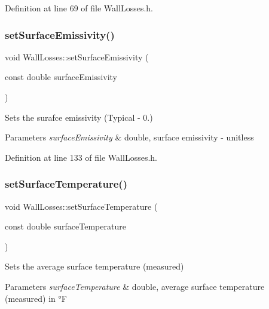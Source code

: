 Definition at line 69 of file Wall\+Losses.\+h.

\mbox{\label{class_wall_losses_ad0ebd1a0a1b32a2358da15b6c8e63d3a}} 
\subsubsection{\texorpdfstring{set\+Surface\+Emissivity()}{setSurfaceEmissivity()}}
{\footnotesize\ttfamily void Wall\+Losses\+::set\+Surface\+Emissivity (\begin{DoxyParamCaption}\item[{const double}]{surface\+Emissivity }\end{DoxyParamCaption})\hspace{0.3cm}{\ttfamily [inline]}}

Sets the surafce emissivity (Typical -\/ 0.) 
\begin{DoxyParams}{Parameters}
{\em surface\+Emissivity} & double, surface emissivity -\/ unitless \\
\hline
\end{DoxyParams}


Definition at line 133 of file Wall\+Losses.\+h.

\mbox{\label{class_wall_losses_a7aaa1bd0d7e0ec67db33668ccc6c48da}} 
\subsubsection{\texorpdfstring{set\+Surface\+Temperature()}{setSurfaceTemperature()}}
{\footnotesize\ttfamily void Wall\+Losses\+::set\+Surface\+Temperature (\begin{DoxyParamCaption}\item[{const double}]{surface\+Temperature }\end{DoxyParamCaption})\hspace{0.3cm}{\ttfamily [inline]}}

Sets the average surface temperature (measured) 
\begin{DoxyParams}{Parameters}
{\em surface\+Temperature} & double, average surface temperature (measured) in °F \\
\hline
\end{DoxyParams}


